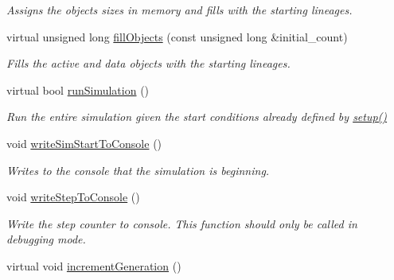 \begin{DoxyCompactItemize}
\begin{DoxyCompactList}\small\item\em Assigns the objects sizes in memory and fills with the starting lineages. \end{DoxyCompactList}\item 
virtual unsigned long \hyperlink{class_tree_a4af845777294c9116c60115e651620b4}{fill\+Objects} (const unsigned long \&initial\+\_\+count)
\begin{DoxyCompactList}\small\item\em Fills the active and data objects with the starting lineages. \end{DoxyCompactList}\item 
virtual bool \hyperlink{class_tree_afe75245862a1c40030c1c8607518cf8d}{run\+Simulation} ()
\begin{DoxyCompactList}\small\item\em Run the entire simulation given the start conditions already defined by \hyperlink{class_tree_aec10ea2b720edc13a38310afdfe2b6e4}{setup()} \end{DoxyCompactList}\item 
void \hyperlink{class_tree_a95360a2f62ef0eb436d586552b299e1f}{write\+Sim\+Start\+To\+Console} ()\hypertarget{class_tree_a95360a2f62ef0eb436d586552b299e1f}{}\label{class_tree_a95360a2f62ef0eb436d586552b299e1f}

\begin{DoxyCompactList}\small\item\em Writes to the console that the simulation is beginning. \end{DoxyCompactList}\item 
void \hyperlink{class_tree_a37de93174eece50a2fc082b683d97047}{write\+Step\+To\+Console} ()\hypertarget{class_tree_a37de93174eece50a2fc082b683d97047}{}\label{class_tree_a37de93174eece50a2fc082b683d97047}

\begin{DoxyCompactList}\small\item\em Write the step counter to console. This function should only be called in debugging mode. \end{DoxyCompactList}\item 
virtual void \hyperlink{class_tree_a3f0c8928b4b72fb6f03cabd4d0e04457}{increment\+Generation} ()\hypertarget{class_tree_a3f0c8928b4b72fb6f03cabd4d0e04457}{}\label{class_tree_a3f0c8928b4b72fb6f03cabd4d0e04457}


\end{DoxyCompactItemize}
